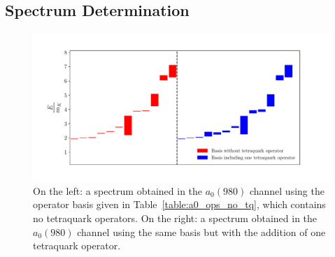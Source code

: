 \subsection{Spectrum Determination}
\begin{figure}
  \centering
  \hspace*{-1.4in}\includegraphics[width=1.5\textwidth]{figures/spectrum_a1gm/staircase.pdf}
  \caption{On the left: a spectrum obtained in the $a_0(980)$ channel using the operator basis given in Table~\ref{table:a0_ops_no_tq}, which contains no tetraquark operators. On the right: a spectrum obtained in the $a_0(980)$ channel using the same basis but with the addition of one tetraquark operator.}
  \label{fig:a0_spectrum}
\end{figure}

